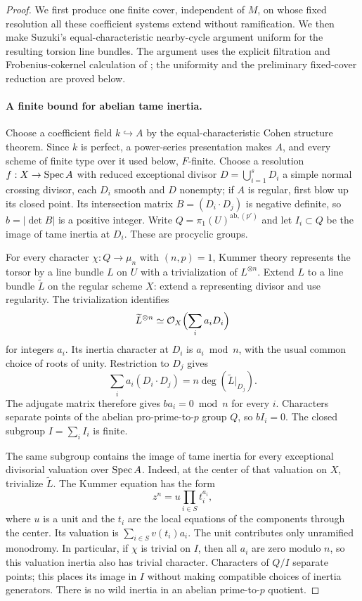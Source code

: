 \begin{proof}
We first produce one finite cover, independent of $M$, on whose
fixed resolution all these coefficient systems extend without
ramification. We then make Suzuki's equal-characteristic
nearby-cycle argument uniform for the resulting torsion line bundles.
The argument uses the explicit filtration and Frobenius-cokernel
calculation of \cite[Propositions 2.1 and 3.1--3.4, pp.~4--7]{Suzuki2023};
the uniformity and the preliminary fixed-cover reduction are proved below.

\paragraph{A finite bound for abelian tame inertia.}
Choose a coefficient field $k\hookrightarrow A$ by the equal-characteristic
Cohen structure theorem. Since $k$ is perfect, a power-series presentation
makes $A$, and every scheme of finite type over it used below, $F$-finite.
Choose a resolution $f:X\to\operatorname{Spec} A$ with reduced exceptional divisor
$D=\bigcup_{i=1}^s D_i$ a simple normal crossing divisor, each $D_i$
smooth and $D$ nonempty; if $A$ is regular, first blow up its closed point.
Its intersection matrix $B=(D_i\cdot D_j)$ is negative definite,
so $b=|\det B|$ is a positive integer. Write
$Q=\pi_1(U)^{\mathrm{ab},(p')}$ and let $I_i\subset Q$ be the image
of tame inertia at $D_i$. These are procyclic groups.

For every character $\chi:Q\to\mu_n$ with $(n,p)=1$, Kummer theory
represents the torsor by a line bundle $L$ on $U$ with a trivialization
of $L^{\otimes n}$. Extend $L$ to a line bundle $\widetilde L$ on the
regular scheme $X$: extend a representing divisor and use regularity.
The trivialization identifies
\[
 \widetilde L^{\otimes n}\simeq
 \mathcal O_X\Bigl(\sum_i a_iD_i\Bigr)
\]
for integers $a_i$. Its inertia character at $D_i$ is $a_i\bmod n$,
with the usual common choice of roots of unity. Restriction to $D_j$
gives
\[
 \sum_i a_i(D_i\cdot D_j)
       =n\deg(\widetilde L|_{D_j}).
\]
The adjugate matrix therefore gives $ba_i=0\bmod n$ for every $i$.
Characters separate points of the abelian pro-prime-to-$p$ group $Q$,
so $bI_i=0$. The closed subgroup $I=\sum_i I_i$ is finite.

The same subgroup contains the image of tame inertia for every
exceptional divisorial valuation over $\operatorname{Spec} A$. Indeed, at the center
of that valuation on $X$, trivialize $\widetilde L$. The Kummer equation
has the form
\[
 z^n=u\prod_{i\in S}t_i^{a_i},
\]
where $u$ is a unit and the $t_i$ are the local equations of the
components through the center. Its valuation is
$\sum_{i\in S}v(t_i)a_i$. The unit contributes only unramified
monodromy. In particular, if $\chi$ is trivial on $I$, then all $a_i$ are zero
modulo $n$, so this valuation inertia also has trivial character.
Characters of $Q/I$ separate points; this places its image in $I$
without making compatible choices of inertia generators.
There is no wild inertia in an abelian prime-to-$p$ quotient.


\end{proof}
